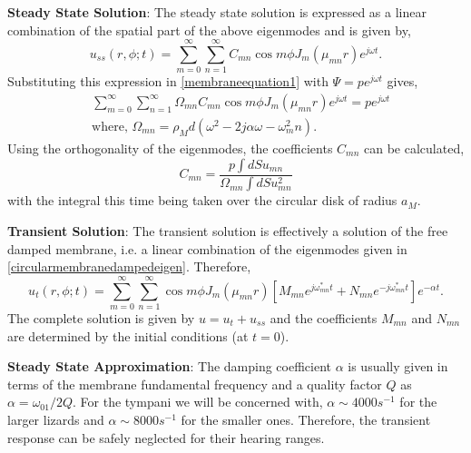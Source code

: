 \noindent\textbf{Steady State Solution}: The steady state solution is expressed as a linear combination of the spatial part
of the above eigenmodes and is given by,
\begin{equation}\label{membraness1}
 u_{ss}(r,\phi ;t)=\displaystyle\sum^\infty_{m=0}\sum^\infty_{n=1} C_{mn}\cos m\phi J_m(\mu_{mn} r)e^{j\omega t}.
\end{equation}
Substituting this expression in \eqref{membraneequation1} with $\Psi=pe^{j\omega t}$ gives,
\begin{align}
 &\displaystyle\sum^\infty_{m=0}\sum^\infty_{n=1} \Omega_{mn}C_{mn}\cos m\phi J_m(\mu_{mn} r)e^{j\omega t}=pe^{j\omega t}\label{membraness2}\\
 &\text{where,  }\Omega_{mn}=\rho_M d (\omega^2-2j\alpha\omega-\omega^2_mn)\label{omegafirstdef}.
\end{align}
Using the orthogonality of the eigenmodes, the coefficients $C_{mn}$ can be calculated,
\begin{equation}\label{sscoeffs}
 C_{mn}=\frac{p\int dS u_{mn}}{\Omega_{mn}\int dS u^2_{mn}}
\end{equation}
with the integral this time being taken over the circular disk of radius $a_M$.

\vspace{\baselineskip}
\noindent\textbf{Transient Solution}: The transient solution is effectively a solution of the free damped membrane, i.e. a linear 
combination of the eigenmodes given in \eqref{circularmembranedampedeigen}. Therefore,
\begin{equation}\label{membranet1}
 u_t(r,\phi;t)=\displaystyle\sum^\infty_{m=0}\sum^\infty_{n=1}\cos m\phi J_m(\mu_{mn} r)\left[M_{mn}e^{j\omega_{mn}^* t}+N_{mn}e^{-j\omega_{mn}^* t}\right]e^{-\alpha t}.
\end{equation}
The complete solution is given by $u=u_t+u_{ss}$ and the coefficients $M_{mn}$ and $N_{mn}$ are determined by the initial conditions (at $t=0$).

\vspace{\baselineskip}
\textbf{Steady State Approximation}: The damping coefficient $\alpha$ is usually given in terms of the membrane fundamental frequency and a quality factor $Q$ as $\alpha=\omega_{01}/2Q$. For the tympani
we will be concerned with, $\alpha\sim 4000s^{-1} $ for the larger lizards and $\alpha\sim 8000s^{-1}$ for the smaller ones. Therefore, the transient response can be 
safely neglected for their hearing ranges.
